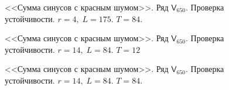 \documentclass[specialist,
               substylefile = spbu.rtx,
               subf,href,colorlinks=true, 12p]{disser}
\begin{document}
\begin{figure}[h]
	\captionsetup{justification=centering}
	\caption{<<Сумма синусов с красным шумом>>. Ряд $\mathsf{V}_{650}$. Проверка устойчивости. $r = 4, \; L = 175$. $T = 84$.}
	\label{serrloopsr4.84}
\end{figure}

\begin{figure}[h]
	\captionsetup{justification=centering}
	\caption{<<Сумма синусов с красным шумом>>. Ряд $\mathsf{V}_{650}$. Проверка устойчивости. $r = 14, \; L = 84$. $T = 12$}
	\label{serrloopsr14.12}
\end{figure}

\begin{figure}[h]
	\captionsetup{justification=centering}
	\caption{<<Сумма синусов с красным шумом>>. Ряд $\mathsf{V}_{650}$. Проверка устойчивости. $r = 14, \; L = 84$. $T = 84$.}
	\label{serrloopsr14.84}
\end{figure}
\end{document}
